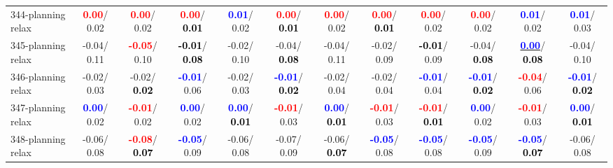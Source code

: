 \begin{table}[h]
\begin{center}
{\begin{tabular}{lc|c|c|c|c|c|c|c|c|c|c}
344-planning relax & \textcolor{red}{\textbf{  0.00}}/  0.02 & \textcolor{red}{\textbf{  0.00}}/  0.02 & \textcolor{red}{\textbf{  0.00}}/\textcolor{black}{\textbf{  0.01}} & \textcolor{blue}{\textbf{  0.01}}/  0.02 & \textcolor{red}{\textbf{  0.00}}/\textcolor{black}{\textbf{  0.01}} & \textcolor{red}{\textbf{  0.00}}/  0.02 & \textcolor{red}{\textbf{  0.00}}/\textcolor{black}{\textbf{  0.01}} & \textcolor{red}{\textbf{  0.00}}/  0.02 & \textcolor{red}{\textbf{  0.00}}/  0.02 & \textcolor{blue}{\textbf{  0.01}}/  0.02 & \textcolor{blue}{\textbf{  0.01}}/  0.03 \\
345-planning relax &  -0.04/  0.11 & \textcolor{red}{\textbf{ -0.05}}/  0.10 & \textcolor{black}{\textbf{ -0.01}}/\textcolor{black}{\textbf{  0.08}} &  -0.02/  0.10 &  -0.04/\textcolor{black}{\textbf{  0.08}} &  -0.04/  0.11 &  -0.02/  0.09 & \textcolor{black}{\textbf{ -0.01}}/  0.09 &  -0.04/\textcolor{black}{\textbf{  0.08}} & \underline{\textcolor{blue}{\textbf{  0.00}}}/\textcolor{black}{\textbf{  0.08}} &  -0.04/  0.10 \\
346-planning relax &  -0.02/  0.03 &  -0.02/\textcolor{black}{\textbf{  0.02}} & \textcolor{blue}{\textbf{ -0.01}}/  0.06 &  -0.02/  0.03 & \textcolor{blue}{\textbf{ -0.01}}/\textcolor{black}{\textbf{  0.02}} &  -0.02/  0.04 &  -0.02/  0.04 & \textcolor{blue}{\textbf{ -0.01}}/  0.04 & \textcolor{blue}{\textbf{ -0.01}}/\textcolor{black}{\textbf{  0.02}} & \textcolor{red}{\textbf{ -0.04}}/  0.06 & \textcolor{blue}{\textbf{ -0.01}}/\textcolor{black}{\textbf{  0.02}} \\
347-planning relax & \textcolor{blue}{\textbf{  0.00}}/  0.02 & \textcolor{red}{\textbf{ -0.01}}/  0.02 & \textcolor{blue}{\textbf{  0.00}}/  0.02 & \textcolor{blue}{\textbf{  0.00}}/\textcolor{black}{\textbf{  0.01}} & \textcolor{red}{\textbf{ -0.01}}/  0.03 & \textcolor{blue}{\textbf{  0.00}}/\textcolor{black}{\textbf{  0.01}} & \textcolor{red}{\textbf{ -0.01}}/  0.03 & \textcolor{red}{\textbf{ -0.01}}/\textcolor{black}{\textbf{  0.01}} & \textcolor{blue}{\textbf{  0.00}}/  0.02 & \textcolor{red}{\textbf{ -0.01}}/  0.03 & \textcolor{blue}{\textbf{  0.00}}/\textcolor{black}{\textbf{  0.01}} \\
348-planning relax &  -0.06/  0.08 & \textcolor{red}{\textbf{ -0.08}}/\textcolor{black}{\textbf{  0.07}} & \textcolor{blue}{\textbf{ -0.05}}/  0.09 &  -0.06/  0.08 &  -0.07/  0.09 &  -0.06/\textcolor{black}{\textbf{  0.07}} & \textcolor{blue}{\textbf{ -0.05}}/  0.08 & \textcolor{blue}{\textbf{ -0.05}}/  0.08 & \textcolor{blue}{\textbf{ -0.05}}/  0.09 & \textcolor{blue}{\textbf{ -0.05}}/\textcolor{black}{\textbf{  0.07}} &  -0.06/  0.08 \\ \hline

\end{tabular}}
\end{center}
\end{table}

